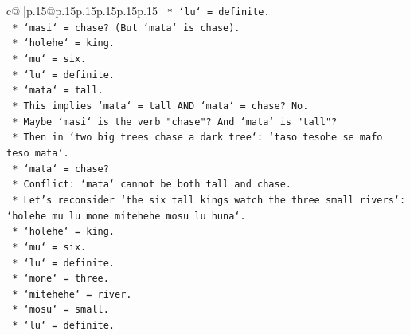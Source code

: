 \documentclass{article}
\begin{document}
{\begin{supertabular}{c@{$\;$}|p{.15\linewidth}@{}p{.15\linewidth}p{.15\linewidth}p{.15\linewidth}p{.15\linewidth}p{.15\linewidth}}
{{{\texttt{                                                *   `lu` = definite.} \\
\texttt{                                                *   `masi` = chase? (But `mata` is chase).} \\
\texttt{                                                *   `holehe` = king.} \\
\texttt{                                                *   `mu` = six.} \\
\texttt{                                                *   `lu` = definite.} \\
\texttt{                                                *   `mata` = tall.} \\
\texttt{                                                *   This implies `mata` = tall AND `mata` = chase? No.} \\
\texttt{                                                *   Maybe `masi` is the verb "chase"? And `mata` is "tall"?} \\
\texttt{                                                *   Then in `two big trees chase a dark tree`: `taso tesohe se mafo teso mata`.} \\
\texttt{                                                    *   `mata` = chase?} \\
\texttt{                                                    *   Conflict: `mata` cannot be both tall and chase.} \\
\texttt{                                                *   Let's reconsider `the six tall kings watch the three small rivers`: `holehe mu lu mone mitehehe mosu lu huna`.} \\
\texttt{                                                    *   `holehe` = king.} \\
\texttt{                                                    *   `mu` = six.} \\
\texttt{                                                    *   `lu` = definite.} \\
\texttt{                                                    *   `mone` = three.} \\
\texttt{                                                    *   `mitehehe` = river.} \\
\texttt{                                                    *   `mosu` = small.} \\
\texttt{                                                    *   `lu` = definite.} \\
}}}
\end{supertabular}}
\end{document}
